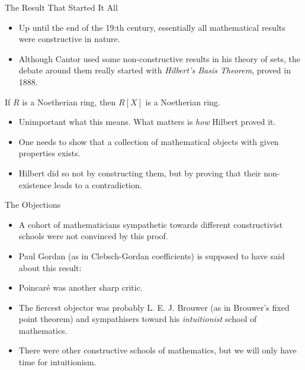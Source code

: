 \begin{frame}{The Result That Started It All}
\begin{itemize}
\item Up until the end of the 19:th century, essentially all mathematical results were constructive in nature. 
\pause
\item Although Cantor used some non-constructive results in his theory of sets, the debate around them really started with \emph{Hilbert's Basis Theorem}, proved in 1888. 
\end{itemize}
\pause
\begin{theorem}
If $R$ is a Noetherian ring, then $R[X]$ is a Noetherian ring. 
\end{theorem}
\pause
\begin{itemize}
\item Unimportant what this means. What matters is \emph{how} Hilbert proved it.
\pause
\item One needs to show that a collection of mathematical objects with given properties exists. 
\pause
\item Hilbert did so not by constructing them, but by proving that their non-existence leads to a contradiction.
\end{itemize}
\end{frame}

\begin{frame}{The Objections}
\begin{itemize}
\item A cohort of mathematicians sympathetic towards different constructivist schools were not convinced by this proof. 
\pause
\item Paul Gordan (as in Clebsch-Gordan coefficients) is supposed to have said about this result:

\emph{}
\pause

\item Poincaré was another sharp critic. 
\pause
\item The fiercest objector was probably L. E. J. Brouwer (as in Brouwer's fixed point theorem) and sympathisers toward his \emph{intuitionist} school of mathematics. 
\pause
\item There were other constructive schools of mathematics, but we will only have time for intuitionism.
\end{itemize}
\end{frame}

